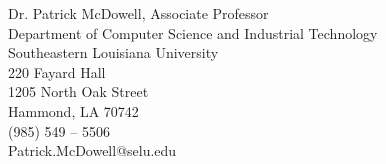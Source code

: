 \documentclass{res}
\begin{document}
\begin{resume}
\begin{multicols}{2}
		Dr. Patrick McDowell, Associate Professor \\
		Department of Computer Science and Industrial Technology\\
		Southeastern Louisiana University \\
		220 Fayard Hall \\
		1205 North Oak Street \\
		Hammond, LA 70742 \\
		(985) 549 – 5506 \\
		Patrick.McDowell@selu.edu\\
	\end{multicols}
	









\end{resume}
\end{document}
